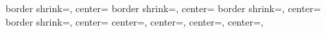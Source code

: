 %
%
%
%
%
%
{%
	\edef\pgfpageoptionheight{\the\paperheight}%
	\edef\pgfpageoptionwidth{\the\paperwidth}%
	\edef\pgfpageoptionborder{1pt}%
}
{%
  {%
    border shrink=\pgfpageoptionborder,%
    center=\pgfpoint{.5\pgfphysicalwidth}{.5\pgfphysicalheight}%
  }%
  {%
    border shrink=\pgfpageoptionborder,%
    center=\pgfpoint{\pgfphysicalwidth}{.5\pgfphysicalheight}%
  }%
  {%
    border shrink=\pgfpageoptionborder,%
    center=\pgfpoint{.5\pgfphysicalwidth}{0cm}%
  }%
  {%
    border shrink=\pgfpageoptionborder,%
    center=\pgfpoint{\pgfphysicalwidth}{0cm}%
  }%
  {%
    center=\pgfpoint{\pgfphysicalwidth}{.5\pgfphysicalheight},%
  }%
  {%
    center=\pgfpoint{.5\pgfphysicalwidth}{.5\pgfphysicalheight},%
	}%
  {%
    center=\pgfpoint{\pgfphysicalwidth}{0cm},%
  }%
  {%
    center=\pgfpoint{.5\pgfphysicalwidth}{0cm},%
  }%
}%